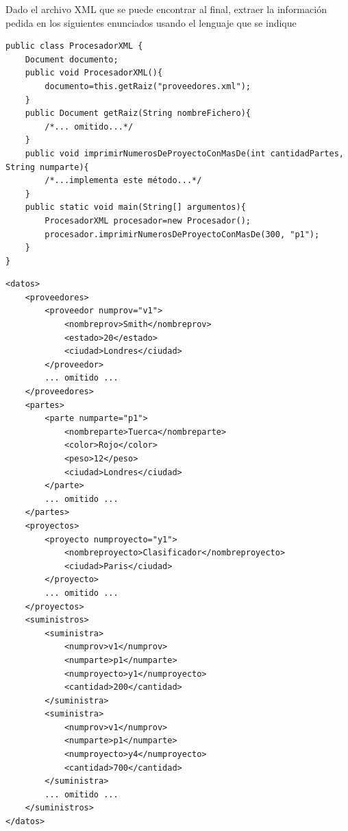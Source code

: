\documentclass{examen}
\begin{document}

Dado el archivo XML que se puede encontrar al final, extraer la información pedida en los siguientes enunciados usando el lenguaje que se indique



\begin{verbatim}
public class ProcesadorXML {
    Document documento;
    public void ProcesadorXML(){
        documento=this.getRaiz("proveedores.xml");    
    }
    public Document getRaiz(String nombreFichero){
        /*... omitido...*/    
    }
    public void imprimirNumerosDeProyectoConMasDe(int cantidadPartes, String numparte){
        /*...implementa este método...*/
    }
    public static void main(String[] argumentos){
        ProcesadorXML procesador=new Procesador();
        procesador.imprimirNumerosDeProyectoConMasDe(300, "p1");
    }
}
\end{verbatim}

\break 
\begin{verbatim}
<datos>
    <proveedores>
        <proveedor numprov="v1">
            <nombreprov>Smith</nombreprov>
            <estado>20</estado>
            <ciudad>Londres</ciudad>
        </proveedor>
        ... omitido ...
    </proveedores>
    <partes>
        <parte numparte="p1">
            <nombreparte>Tuerca</nombreparte>
            <color>Rojo</color>
            <peso>12</peso>
            <ciudad>Londres</ciudad>
        </parte>
        ... omitido ...
    </partes>
    <proyectos>
        <proyecto numproyecto="y1">
            <nombreproyecto>Clasificador</nombreproyecto>
            <ciudad>Paris</ciudad>
        </proyecto>
        ... omitido ...
    </proyectos>
    <suministros>
        <suministra>
            <numprov>v1</numprov>
            <numparte>p1</numparte>
            <numproyecto>y1</numproyecto>
            <cantidad>200</cantidad>
        </suministra>
        <suministra>
            <numprov>v1</numprov>
            <numparte>p1</numparte>
            <numproyecto>y4</numproyecto>
            <cantidad>700</cantidad>
        </suministra>
        ... omitido ...
    </suministros>
</datos>
\end{verbatim}
\end{document}
